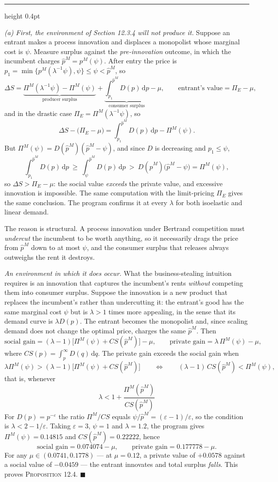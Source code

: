 \documentclass[11pt,letterpaper,reqno]{amsart}
\makeatletter
\newcommand{\wh}[1]{\widehat{#1}}
\newcommand{\dd}{\,\mathrm{d}}
\newcommand{\as@head}[3]{%
  \par\addvspace{1.6ex}\penalty-200\relax
  \phantomsection
  \addcontentsline{toc}{subsection}{#1 #2\texorpdfstring{\ifx\relax#3\relax\else\quad #3\fi}{}}%
  {\color{RuleGrey}\hrule height 0.4pt}%
  \nobreak\vspace{0.8ex}\nobreak
  \noindent{\bfseries #1 #2}%
  \ifx\relax#3\relax\else\quad{\bfseries\itshape #3}\fi
  \par\nobreak\vspace{0.4ex}\nobreak
  \as@beginstatement
}
\newcommand{\as@beginstatement}{\begingroup\itshape\ignorespaces}
\newenvironment{aex}[2]{\as@head{Exercise}{#1}{#2}}{\par\addvspace{1.2ex}}
\newcommand{\bk}[1]{\textup{\textsc{#1}}}
\renewcommand{\as@beginstatement}{\ignorespaces}
\makeatother
\begin{document}
\begin{aex}{12.8}{}
\emph{(a) First, the environment of Section 12.3.4 will not produce it.}  Suppose an entrant makes
a process innovation and displaces a monopolist whose marginal cost is $\psi$.  Measure surplus
against the \emph{pre-innovation} outcome, in which the incumbent charges $\wh p^{M}=p^{M}(\psi)$.
After entry the price is $p_1=\min\{p^{M}(\lambda^{-1}\psi),\psi\}\le\psi<\wh p^{M}$, so
\[
\Delta S=\underbrace{\Pi^{M}(\lambda^{-1}\psi)-\Pi^{M}(\psi)}_{\text{producer surplus}}
+\underbrace{\int_{p_1}^{\wh p^{M}}D(p)\dd p}_{\text{consumer surplus}}-\mu ,
\qquad
\text{entrant's value}=\Pi_E-\mu ,
\]
and in the drastic case $\Pi_E=\Pi^{M}(\lambda^{-1}\psi)$, so
\[
\Delta S-\bigl(\Pi_E-\mu\bigr)=\int_{p_1}^{\wh p^{M}}D(p)\dd p-\Pi^{M}(\psi) .
\]
But $\Pi^{M}(\psi)=D(\wh p^{M})(\wh p^{M}-\psi)$, and since $D$ is decreasing and
$p_1\le\psi$,
\[
\int_{p_1}^{\wh p^{M}}D(p)\dd p\ \ge\ \int_{\psi}^{\wh p^{M}}D(p)\dd p
\ >\ D(\wh p^{M})\bigl(\wh p^{M}-\psi\bigr)=\Pi^{M}(\psi) ,
\]
so $\Delta S>\Pi_E-\mu$: the social value \emph{exceeds} the private value, and excessive
innovation is impossible.  The same computation with the limit-pricing $\Pi_E$ gives the same
conclusion.  The program confirms it at every $\lambda$ for both isoelastic and linear demand.

The reason is structural.  A process innovation under Bertrand competition must \emph{undercut}
the incumbent to be worth anything, so it necessarily drags the price from $\wh p^{M}$ down to at
most $\psi$, and the consumer surplus that releases always outweighs the rent it destroys.

\emph{An environment in which it does occur.}  What the business-stealing intuition requires is an
innovation that captures the incumbent's rents \emph{without} competing them into consumer
surplus.  Suppose the innovation is a new product that replaces the incumbent's rather than
undercutting it: the entrant's good has the same marginal cost $\psi$ but is $\lambda>1$ times
more appealing, in the sense that its demand curve is $\lambda D(p)$.  The entrant becomes the
monopolist and, since scaling demand does not change the optimal price, charges the same
$\wh p^{M}$.  Then
\[
\text{social gain}=(\lambda-1)\bigl[\Pi^{M}(\psi)+CS(\wh p^{M})\bigr]-\mu ,
\qquad
\text{private gain}=\lambda\,\Pi^{M}(\psi)-\mu ,
\]
where $CS(p)=\int_{p}^{\infty}D(q)\dd q$.  The private gain exceeds the social gain when
\[
\lambda\Pi^{M}(\psi)>(\lambda-1)\bigl[\Pi^{M}(\psi)+CS(\wh p^{M})\bigr]
\qquad\Longleftrightarrow\qquad
(\lambda-1)\,CS(\wh p^{M})<\Pi^{M}(\psi),
\]
that is, whenever
\[
\boxed{\ \lambda<1+\frac{\Pi^{M}(\wh p^{M})}{CS(\wh p^{M})}\ }
\]
For $D(p)=p^{-\varepsilon}$ the ratio $\Pi^{M}/CS$ equals $\psi/\wh p^{M}=(\varepsilon-1)/\varepsilon$,
so the condition is $\lambda<2-1/\varepsilon$.  Taking $\varepsilon=3$, $\psi=1$ and $\lambda=1.2$,
the program gives $\Pi^{M}(\psi)=0.14815$ and $CS(\wh p^{M})=0.22222$, hence
\[
\text{social gain}=0.074074-\mu,
\qquad
\text{private gain}=0.177778-\mu .
\]
For any $\mu\in(0.0741,0.1778)$ --- at $\mu=0.12$, a private value of $+0.0578$ against a social
value of $-0.0459$ --- the entrant innovates and total surplus \emph{falls}.  This proves
\bk{Proposition 12.4}. $\blacksquare$


\end{aex}
\end{document}
